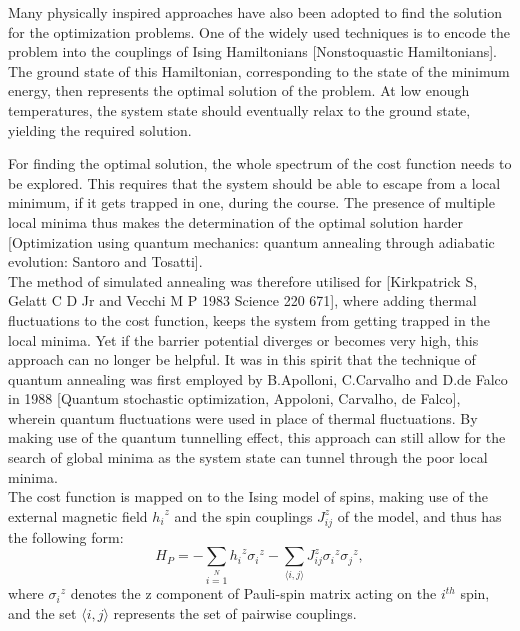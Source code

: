 \documentclass[../main.tex]{subfiles}
\begin{document}
Many physically inspired approaches have also been adopted to find the solution for the optimization problems. One of the widely used techniques is to encode the problem into the couplings of Ising Hamiltonians [Nonstoquastic Hamiltonians]. The ground state of this Hamiltonian, corresponding to the state of the minimum energy, then represents the optimal solution of the problem. At low enough temperatures, the system state should eventually relax to the ground state, yielding the required solution.

For finding the optimal solution, the whole spectrum of the cost function needs to be explored. This requires that the system should be able to escape from a local minimum, if it gets trapped in one, during the course. The presence of multiple local minima thus makes the determination of the optimal solution harder [Optimization using quantum mechanics: quantum annealing through adiabatic evolution: Santoro and Tosatti].\\
 
The method of simulated annealing was therefore utilised for [Kirkpatrick S, Gelatt C D Jr and Vecchi M P 1983 Science 220 671], where adding thermal fluctuations to the cost function, keeps the system from getting trapped in the local minima. Yet if the barrier potential diverges or becomes very high, this approach can no longer be helpful. It was in this spirit that the technique of quantum annealing was first employed by B.Apolloni, C.Carvalho and D.de Falco in 1988 [Quantum stochastic optimization, Appoloni, Carvalho, de Falco], wherein quantum fluctuations were used in place of thermal fluctuations. By making use of the quantum tunnelling effect, this approach can still allow for the search of global minima as the system state can tunnel through the poor local minima.\\
 
The cost function is mapped on to the Ising model of spins, making use of the external magnetic field ${h_i}^z$ and the spin couplings ${J_{ij}^z}$ of the model, and thus has the following form:
\begin{equation}
H_P=-\sum\limits_{i=1}\limits^{N}{h_i}^z{\sigma_i}^z - \sum\limits_{\langle i,j \rangle}{J_{ij}^z} {\sigma_i}^z{\sigma_j}^z, \label{eq:b4}
\end{equation}
where ${\sigma_i}^z$ denotes the z component of Pauli-spin matrix acting on the $i^{th}$ spin, and the set $\langle i,j \rangle$ represents the set of pairwise couplings.
\end{document}
